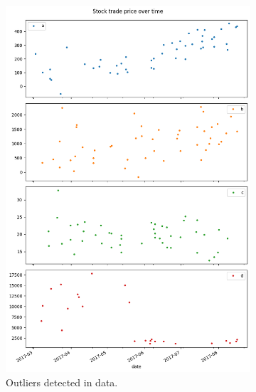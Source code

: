 \documentclass[12pt]{article}
\begin{document}
\begin{figure}[ht]
\centering
\begin{subfigure}{.5\textwidth}
  \centering
  \includegraphics[width=\linewidth]{outliers.png}
  \caption{Outliers detected in data.}
\end{subfigure}%
\begin{subfigure}{.5\textwidth}
  \centering

\end{subfigure}
\end{figure}
\end{document}
